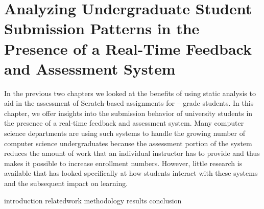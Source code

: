 \chapter{Analyzing Undergraduate Student Submission Patterns in the Presence of
  a Real-Time Feedback and Assessment System}
\label{chap:feedback}

\def\currentprefix{feedback}

In the previous two chapters we looked at the benefits of using static analysis
to aid in the assessment of Scratch-based assignments for --
grade students. In this chapter, we offer insights into the submission behavior
of university students in the presence of a real-time feedback and assessment
system. Many computer science departments are using such systems to handle the
growing number of computer science undergraduates because the assessment
portion of the system reduces the amount of work that an individual instructor
has to provide and thus makes it possible to increase enrollment
numbers. However, little research is available that has looked specifically at
how students interact with these systems and the subsequent impact on learning.

{introduction}
{relatedwork}
{methodology}
{results}
{conclusion}
